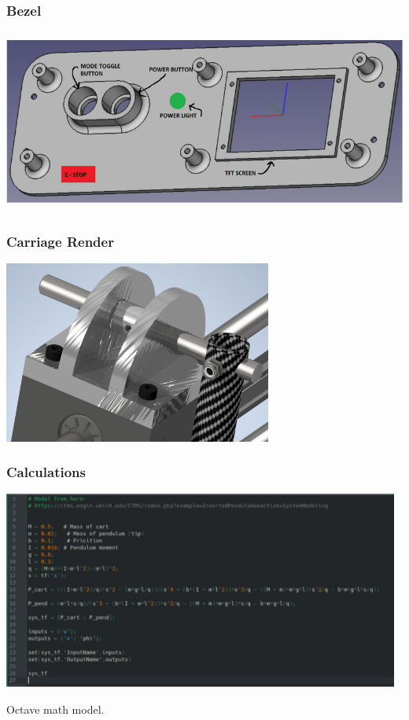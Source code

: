 \documentclass[aspectratio=169]{beamer}
\begin{document}
\begin{frame}
    \frametitle{Bezel}

    \includegraphics[height=6cm]{closeup4}
\end{frame}

\begin{frame}
    \frametitle{Carriage Render}

    \includegraphics[height=6cm]{closeup5}
\end{frame}

\begin{frame}
    \frametitle{Calculations}

    \includegraphics[height=6.5cm]{Calculations}

    Octave math model.
\end{frame}
\end{document}
